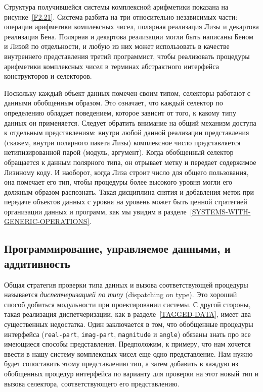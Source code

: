 Структура получившейся системы комплексной арифметики
показана на рисунке~\ref{F2.21}. Система разбита на три
относительно независимых части: операции арифметики комплексных чисел,
полярная реализация Лизы и декартова реализация Бена.  Полярная и
декартова реализации могли быть написаны Беном и Лизой по
отдельности, и любую из них может использовать в качестве внутреннего
представления третий программист, чтобы реализовать процедуры
арифметики комплексных чисел в терминах абстрактного интерфейса
конструкторов и селекторов.

Поскольку каждый объект данных помечен своим типом,
  селекторы работают с данными обобщенным образом.  Это означает, что 
каждый селектор по определению обладает поведением, которое зависит от
того, к какому типу данных он применяется.  Следует обратить внимание
на общий механизм доступа к отдельным представлениям:  внутри
любой данной реализации представления (скажем, внутри полярного
пакета Лизы) комплексное число представляется нетипизированной парой
(модуль, аргумент).  Когда обобщенный селектор обращается к данным
полярного типа, он отрывает метку и передает содержимое Лизиному
коду.  И наоборот, когда Лиза строит число для общего
пользования, она помечает его тип, чтобы процедуры более высокого
уровня могли его должным образом распознать.  Такая дисциплина снятия
и добавления меток при передаче объектов данных с уровня на уровень
может быть ценной стратегией организации данных и программ, как мы
увидим в разделе~\ref{SYSTEMS-WITH-GENERIC-OPERATIONS}.

\subsection{Программирование, управляемое данными, и аддитивность}
\label{DATA-DIRECTED-PROGRAMMING-AND-ADDITIVITY}


Общая стратегия проверки типа данных и вызова
соответствующей процедуры называется 
{\em диспетчеризацией по типу} (dispatching on type).
Это хороший способ добиться 
модульности при
проектировании системы.  С другой стороны, такая реализация
диспетчеризации, как в разделе~\ref{TAGGED-DATA},
имеет два существенных недостатка. Один заключается в том, что
обобщенные процедуры интерфейса ({\tt real-part},
{\tt imag-part}, {\tt magnitude} и {\tt angle})
обязаны знать про все имеющиеся способы представления.  Предположим, к
примеру, что нам хочется ввести в нашу систему комплексных чисел еще
одно представление.  Нам нужно будет сопоставить этому представлению
тип, а затем добавить в каждую из обобщенных процедур интерфейса по
варианту для проверки на этот новый тип и вызова селектора,
соответствующего его представлению.

